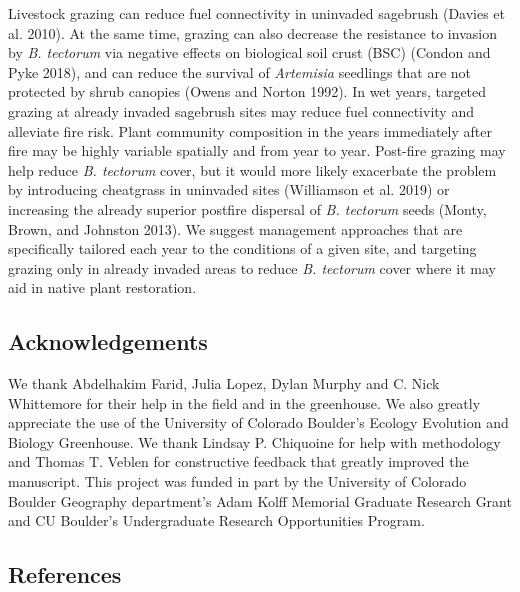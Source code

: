 \documentclass[
  12pt,
]{article}
\begin{document}
Livestock grazing can reduce fuel connectivity in uninvaded sagebrush
(Davies et al. 2010). At the same time, grazing can also decrease the
resistance to invasion by \emph{B. tectorum} via negative effects on
biological soil crust (BSC) (Condon and Pyke 2018), and can reduce the
survival of \emph{Artemisia} seedlings that are not protected by shrub
canopies (Owens and Norton 1992). In wet years, targeted grazing at
already invaded sagebrush sites may reduce fuel connectivity and
alleviate fire risk. Plant community composition in the years
immediately after fire may be highly variable spatially and from year to
year. Post-fire grazing may help reduce \emph{B. tectorum} cover, but it
would more likely exacerbate the problem by introducing cheatgrass in
uninvaded sites (Williamson et al. 2019) or increasing the already
superior postfire dispersal of \emph{B. tectorum} seeds (Monty, Brown,
and Johnston 2013). We suggest management approaches that are
specifically tailored each year to the conditions of a given site, and
targeting grazing only in already invaded areas to reduce \emph{B.
tectorum} cover where it may aid in native plant restoration.

\hypertarget{acknowledgements}{%
\subsection{Acknowledgements}\label{acknowledgements}}

We thank Abdelhakim Farid, Julia Lopez, Dylan Murphy and C. Nick
Whittemore for their help in the field and in the greenhouse. We also
greatly appreciate the use of the University of Colorado Boulder's
Ecology Evolution and Biology Greenhouse. We thank Lindsay P. Chiquoine
for help with methodology and Thomas T. Veblen for constructive feedback
that greatly improved the manuscript. This project was funded in part by
the University of Colorado Boulder Geography department's Adam Kolff
Memorial Graduate Research Grant and CU Boulder's Undergraduate Research
Opportunities Program.

\hypertarget{references}{%
\subsection{References}\label{references}}

\singlespacing
\end{document}
